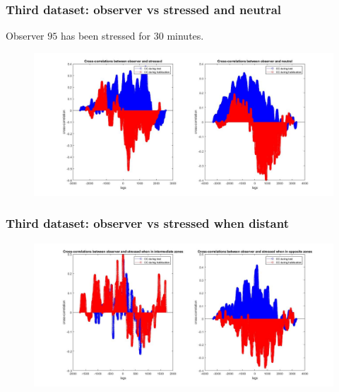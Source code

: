\documentclass{beamer}
\begin{document}
\begin{frame}
\frametitle{Third dataset: observer vs stressed and neutral}

Observer $95$ has been stressed for $30$ minutes.

\begin{figure}[H]
	\begin{center}
		\hspace*{-1cm}
		\includegraphics[scale=.30]{obs_stress_neut.jpg} 
	\end{center}  
	
	
\end{figure}

\end{frame}

\begin{frame}
\frametitle{Third dataset: observer vs stressed when distant}



\begin{figure}[H]
	\begin{center}
		\hspace*{-1cm}
		\includegraphics[scale=.30]{obs_stress_distant.jpg} 
	\end{center}  
	
	
\end{figure}

\end{frame}
\end{document}
